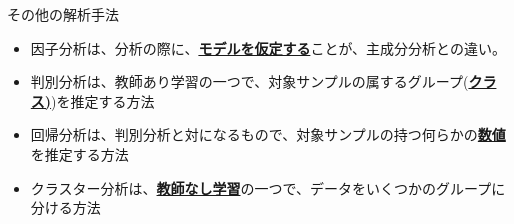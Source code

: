 \documentclass[dvipdfmx,autodetect-engine, unicode, 10pt, aspectratio=169]{beamer}
\begin{document}
\begin{frame}{その他の解析手法}
    \begin{itemize}
        \item 因子分析は、分析の際に、\underline{\textbf{モデルを仮定する}}ことが、主成分分析との違い。
        \item 判別分析は、教師あり学習の一つで、対象サンプルの属するグループ(\underline{\textbf{クラス)}})を推定する方法
        \item 回帰分析は、判別分析と対になるもので、対象サンプルの持つ何らかの\underline{\textbf{数値}}を推定する方法
        \item クラスター分析は、\underline{\textbf{教師なし学習}}の一つで、データをいくつかのグループに分ける方法
    \end{itemize}
\end{frame}
\end{document}
